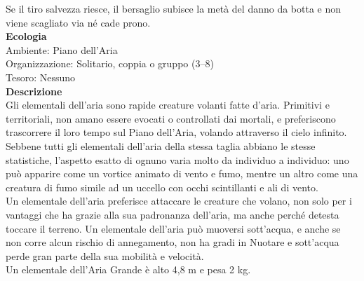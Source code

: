 \begin{multicols}{2}
Se il tiro salvezza riesce, il bersaglio subisce la metà del danno da botta e non viene scagliato via né cade prono.\\
\textbf{Ecologia}\\
Ambiente: Piano dell'Aria\\
Organizzazione: Solitario, coppia o gruppo (3–8)\\
Tesoro: Nessuno\\
\textbf{Descrizione}\\
Gli elementali dell'aria sono rapide creature volanti fatte d'aria. Primitivi e territoriali, non amano essere evocati o controllati dai mortali, e preferiscono trascorrere il loro tempo sul Piano dell'Aria, volando attraverso il cielo infinito.\\
Sebbene tutti gli elementali dell'aria della stessa taglia abbiano le stesse statistiche, l'aspetto esatto di ognuno varia molto da individuo a individuo: uno può apparire come un vortice animato di vento e fumo, mentre un altro come una creatura di fumo simile ad un uccello con occhi scintillanti e ali di vento.\\
Un elementale dell'aria preferisce attaccare le creature che volano, non solo per i vantaggi che ha grazie alla sua padronanza dell'aria, ma anche perché detesta toccare il terreno. Un elementale dell'aria può muoversi sott'acqua, e anche se non corre alcun rischio di annegamento, non ha gradi in Nuotare e sott'acqua perde gran parte della sua mobilità e velocità.\\
Un elementale dell'Aria Grande è alto 4,8 m e pesa 2 kg.\\


\end{multicols}
